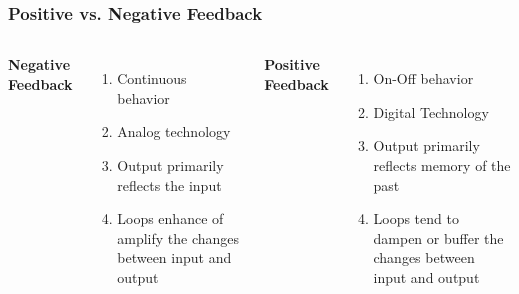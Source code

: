 \documentclass{beamer}
\begin{document}
\begin{frame}
\frametitle{Positive vs. Negative Feedback}
\begin{columns}[c]

\centering \textbf{Negative Feedback}
\begin{enumerate}
\item Continuous behavior
\item Analog technology
\item Output primarily reflects the input
\item Loops enhance of amplify the changes between input and output
\end{enumerate}

\centering \textbf{Positive Feedback}
\begin{enumerate}
\item On-Off behavior
\item Digital Technology
\item Output primarily reflects memory of the past
\item Loops tend to dampen or buffer the changes between input and output
\end{enumerate}

\end{columns}
\end{frame}

\end{document}
